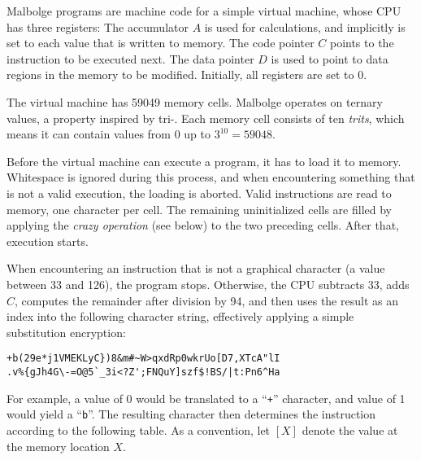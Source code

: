 Malbolge programs are machine code for a simple virtual machine, whose CPU has three registers: The accumulator $A$ is used for calculations, and implicitly is set to each value that is written to memory. The code pointer $C$ points to the instruction to be executed next. The data pointer $D$ is used to point to data regions in the memory to be modified. Initially, all registers are set to 0.

The virtual machine has 59049 memory cells. Malbolge operates on ternary values, a property inspired by tri-\ic{}. Each memory cell consists of ten \emph{trits}, which means it can contain values from $0$ up to $3^{10} = 59048$.

Before the virtual machine can execute a program, it has to load it to memory. Whitespace is ignored during this process, and when encountering something that is not a valid execution, the loading is aborted. Valid instructions are read to memory, one \ascii{} character per cell. The remaining uninitialized cells are filled by applying the \emph{crazy operation} (see below) to the two preceding cells. After that, execution starts.

When encountering an instruction that is not a graphical \ascii{} character (a value between 33 and 126), the program stops. Otherwise, the CPU subtracts 33, adds $C$, computes the remainder after division by 94, and then uses the result as an index into the following character string, effectively applying a simple substitution encryption:

\begin{lstlisting}[numbers=none,frame=none]
+b(29e*j1VMEKLyC})8&m#~W>qxdRp0wkrUo[D7,XTcA"lI
.v%{gJh4G\-=O@5`_3i<?Z';FNQuY]szf$!BS/|t:Pn6^Ha
\end{lstlisting}

For example, a value of 0 would be translated to a “\texttt{+}” character, and value of 1 would yield a “\texttt{b}”. The resulting character then determines the instruction according to the following table. As a convention, let $[X]$ denote the value at the memory location $X$.

